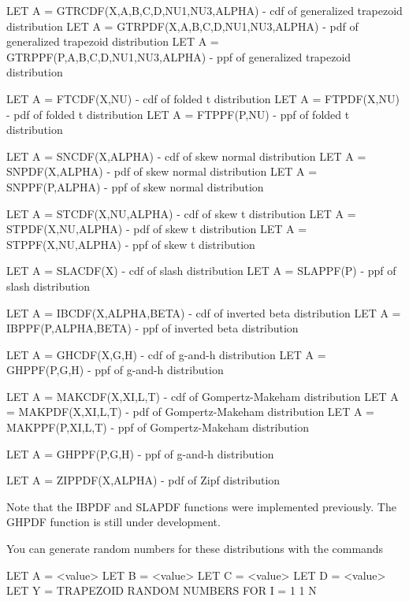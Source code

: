 {       LET A = GTRCDF(X,A,B,C,D,NU1,NU3,ALPHA) - cdf of generalized
                                                 trapezoid distribution
       LET A = GTRPDF(X,A,B,C,D,NU1,NU3,ALPHA) - pdf of generalized
                                                 trapezoid distribution
       LET A = GTRPPF(P,A,B,C,D,NU1,NU3,ALPHA) - ppf of generalized
                                                 trapezoid distribution

       LET A = FTCDF(X,NU)         - cdf of folded t distribution
       LET A = FTPDF(X,NU)         - pdf of folded t distribution
       LET A = FTPPF(P,NU)         - ppf of folded t distribution

       LET A = SNCDF(X,ALPHA)      - cdf of skew normal distribution
       LET A = SNPDF(X,ALPHA)      - pdf of skew normal distribution
       LET A = SNPPF(P,ALPHA)      - ppf of skew normal distribution

       LET A = STCDF(X,NU,ALPHA)   - cdf of skew t distribution
       LET A = STPDF(X,NU,ALPHA)   - pdf of skew t distribution
       LET A = STPPF(X,NU,ALPHA)   - ppf of skew t distribution

       LET A = SLACDF(X)           - cdf of slash distribution
       LET A = SLAPPF(P)           - ppf of slash distribution

       LET A = IBCDF(X,ALPHA,BETA) - cdf of inverted beta distribution
       LET A = IBPPF(P,ALPHA,BETA) - ppf of inverted beta distribution

       LET A = GHCDF(X,G,H)        - cdf of g-and-h distribution
       LET A = GHPPF(P,G,H)        - ppf of g-and-h distribution

       LET A = MAKCDF(X,XI,L,T)    - cdf of Gompertz-Makeham distribution
       LET A = MAKPDF(X,XI,L,T)    - pdf of Gompertz-Makeham distribution
       LET A = MAKPPF(P,XI,L,T)     - ppf of Gompertz-Makeham distribution

       LET A = GHPPF(P,G,H)        - ppf of g-and-h distribution

       LET A = ZIPPDF(X,ALPHA)     - pdf of Zipf distribution

     Note that the IBPDF and SLAPDF functions were implemented
     previously.  The GHPDF function is still under development.

     You can generate random numbers for these distributions
     with the commands

           LET A = <value>
           LET B = <value>
           LET C = <value>
           LET D = <value>
           LET Y = TRAPEZOID RANDOM NUMBERS FOR I = 1 1 N

}
